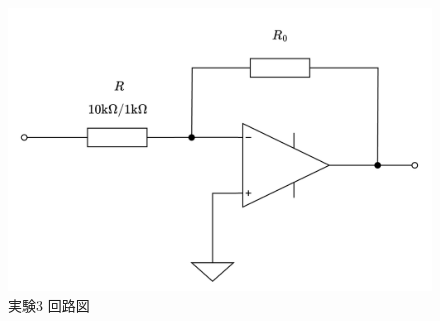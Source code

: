 \begin{figure}[!htb]
	\centering
	\includegraphics[width=0.6\linewidth]{src/figures/exp3/circuit.png}
	\caption{実験3 回路図}\label{fig:exp3-circuit}
\end{figure}

